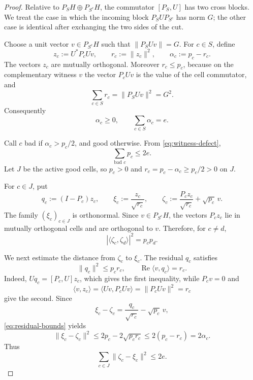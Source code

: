 \documentclass[11pt]{article}
\begin{document}
\begin{proof}
Relative to $P_SH\oplus P_{S^c}H$, the commutator $[P_S,U]$ has two cross
blocks.  We treat the case in which the incoming block
$P_SU P_{S^c}$ has norm $G$; the other case is identical after exchanging
the two sides of the cut.

Choose a unit vector $v\in P_{S^c}H$ such that
$\|P_SUv\|=G$.  For $c\in S$, define
\[
  z_c:=U^*P_cUv,\qquad
  r_c:=\|z_c\|^2,\qquad
  \alpha_c:=p_c-r_c.
\]
The vectors $z_c$ are mutually orthogonal.  Moreover
$r_c\le p_c$, because on the complementary witness $v$ the vector
$P_cUv$ is the value of the cell commutator, and
\[
  \sum_{c\in S}r_c=\|P_SUv\|^2=G^2.
\]
Consequently
\begin{equation}\label{eq:witness-defect}
  \alpha_c\ge0,
  \qquad
  \sum_{c\in S}\alpha_c=e.
\end{equation}

Call $c$ bad if $\alpha_c>p_c/2$, and good otherwise.  From
\eqref{eq:witness-defect},
\begin{equation}\label{eq:badmass}
  \sum_{\text{bad }c}p_c\le2e.
\end{equation}
Let $J$ be the active good cells, so $p_c>0$ and
$r_c=p_c-\alpha_c\ge p_c/2>0$ on $J$.

For $c\in J$, put
\[
  q_c:=(I-P_c)z_c,\qquad
  \xi_c:=\frac{z_c}{\sqrt{r_c}},
  \qquad
  \zeta_c:=
  \frac{P_cz_c}{\sqrt{r_c}}+\sqrt{p_c}\,v.
\]
The family $(\xi_c)_{c\in J}$ is orthonormal.  Since
$v\in P_{S^c}H$, the vectors $P_cz_c$ lie in mutually orthogonal cells and
are orthogonal to $v$.  Therefore, for $c\ne d$,
\begin{equation}\label{eq:zeta-gram}
  |\langle\zeta_c,\zeta_d\rangle|^2=p_cp_d.
\end{equation}

We next estimate the distance from $\zeta_c$ to $\xi_c$.  The residual
$q_c$ satisfies
\begin{equation}\label{eq:residual-bounds}
  \|q_c\|^2\le p_cr_c,
  \qquad
  \operatorname{Re}\langle v,q_c\rangle=r_c.
\end{equation}
Indeed, $Uq_c=[P_c,U]z_c$, which gives the first inequality, while
$P_cv=0$ and
\[
  \langle v,z_c\rangle
  =
  \langle Uv,P_cUv\rangle
  =
  \|P_cUv\|^2=r_c
\]
give the second.  Since
\[
  \xi_c-\zeta_c
  =
  \frac{q_c}{\sqrt{r_c}}-\sqrt{p_c}\,v,
\]
\eqref{eq:residual-bounds} yields
\[
  \|\xi_c-\zeta_c\|^2
  \le
  2p_c-2\sqrt{p_cr_c}
  \le
  2(p_c-r_c)
  =
  2\alpha_c.
\]
Thus
\begin{equation}\label{eq:gram-close}
  \sum_{c\in J}\|\zeta_c-\xi_c\|^2\le2e.
\end{equation}


\end{proof}
\end{document}
